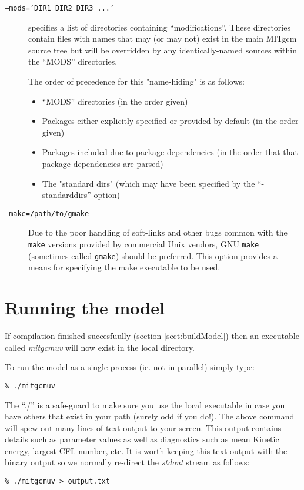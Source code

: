 \begin{description}
\item[\texttt{--mods='DIR1 DIR2 DIR3 ...'}] specifies a list of
  directories containing ``modifications''.  These directories contain
  files with names that may (or may not) exist in the main MITgcm
  source tree but will be overridden by any identically-named sources
  within the ``MODS'' directories.
  
  The order of precedence for this "name-hiding" is as follows:
  \begin{itemize}
  \item ``MODS'' directories (in the order given)
  \item Packages either explicitly specified or provided by default
    (in the order given)
  \item Packages included due to package dependencies (in the order
    that that package dependencies are parsed)
  \item The "standard dirs" (which may have been specified by the
    ``-standarddirs'' option)
  \end{itemize}
  
\item[\texttt{--make=/path/to/gmake}] Due to the poor handling of
  soft-links and other bugs common with the \texttt{make} versions
  provided by commercial Unix vendors, GNU \texttt{make} (sometimes
  called \texttt{gmake}) should be preferred.  This option provides a
  means for specifying the make executable to be used.

\end{description}



\section{Running the model}
\label{sect:runModel}

If compilation finished succesfuully (section \ref{sect:buildModel})
then an executable called {\em mitgcmuv} will now exist in the local
directory.

To run the model as a single process (ie. not in parallel) simply
type:
\begin{verbatim}
% ./mitgcmuv
\end{verbatim}
The ``./'' is a safe-guard to make sure you use the local executable
in case you have others that exist in your path (surely odd if you
do!). The above command will spew out many lines of text output to
your screen.  This output contains details such as parameter values as
well as diagnostics such as mean Kinetic energy, largest CFL number,
etc. It is worth keeping this text output with the binary output so we
normally re-direct the {\em stdout} stream as follows:
\begin{verbatim}
% ./mitgcmuv > output.txt
\end{verbatim}

